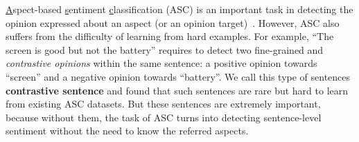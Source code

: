 \underline{A}spect-based \underline{s}entiment \underline{c}lassification (ASC) is an important task in detecting the opinion expressed about an aspect (or an opinion target)~\cite{hu2004mining,liu2015sentiment}.
However, ASC also suffers from the difficulty of learning from hard examples.
For example, ``The screen is good but not the battery'' requires to detect two fine-grained and \textit{contrastive opinions} within the same sentence: a positive opinion towards ``screen'' and a negative opinion towards ``battery''.
We call this type of sentences \textbf{contrastive sentence} and \cite{jiang-etal-2019-challenge} found that such sentences are rare but hard to learn from existing ASC datasets. But these sentences are extremely important, because without them, the task of ASC turns into detecting sentence-level sentiment without the need to know the referred aspects. 

